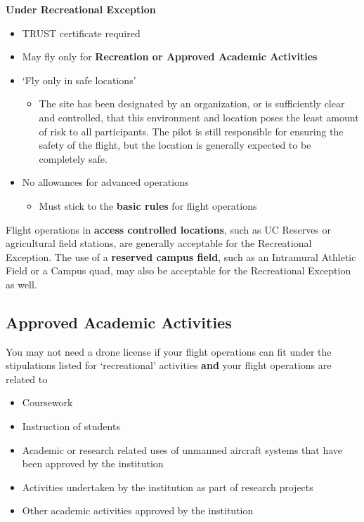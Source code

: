\documentclass[
  12pt,
]{book}
\providecommand{\tightlist}{%
  \setlength{\itemsep}{0pt}\setlength{\parskip}{0pt}}
\begin{document}
\textbf{Under Recreational Exception}

\begin{itemize}
\tightlist
\item
  TRUST certificate required
\item
  May fly only for \textbf{Recreation or Approved Academic Activities}
\item
  `Fly only in safe locations'

  \begin{itemize}
  \tightlist
  \item
    The site has been designated by an organization, or is sufficiently clear and controlled, that this environment and location poses the least amount of risk to all participants. The pilot is still responsible for ensuring the safety of the flight, but the location is generally expected to be completely safe.
  \end{itemize}
\item
  No allowances for advanced operations

  \begin{itemize}
  \tightlist
  \item
    Must stick to the \textbf{basic rules} for flight operations
  \end{itemize}
\end{itemize}

Flight operations in \textbf{access controlled locations}, such as UC Reserves or agricultural field stations, are generally acceptable for the Recreational Exception. The use of a \textbf{reserved campus field}, such as an Intramural Athletic Field or a Campus quad, may also be acceptable for the Recreational Exception as well.

\subsection{Approved Academic Activities}\label{approved-academic-activities}

You may not need a drone license if your flight operations can fit under the stipulations listed for `recreational' activities \textbf{and} your flight operations are related to

\begin{itemize}
\tightlist
\item
  Coursework
\item
  Instruction of students
\item
  Academic or research related uses of unmanned aircraft systems that have been approved by the institution
\item
  Activities undertaken by the institution as part of research projects
\item
  Other academic activities approved by the institution
\end{itemize}
\end{document}
